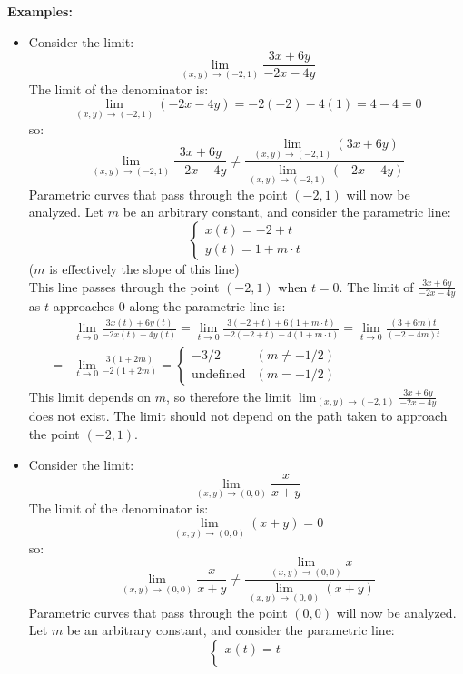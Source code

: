 \documentclass{article}
\begin{document}
\textbf{Examples:}
\begin{itemize}
\item Consider the limit: 
\[\lim_{(x, y) \rightarrow (-2, 1)} \frac{3x + 6y}{-2x - 4y}\] 
The limit of the denominator is:
\[\lim_{(x, y) \rightarrow (-2, 1)} (-2x - 4y) = -2(-2) - 4(1) = 4 - 4 = 0\] so:
\[\lim_{(x, y) \rightarrow (-2, 1)} \frac{3x + 6y}{-2x - 4y} \neq \frac{\lim_{(x, y) \rightarrow (-2, 1)} (3x + 6y)}{\lim_{(x, y) \rightarrow (-2, 1)} (-2x - 4y)}\] 
Parametric curves that pass through the point \((-2, 1)\) will now be analyzed. Let \(m\) be an arbitrary constant, and consider the parametric line:
\[\left\{\begin{array}{c}
x(t) = -2 + t \\ 
y(t) = 1 + m \cdot t
\end{array}\right.\]
(\(m\) is effectively the slope of this line) \\
This line passes through the point \((-2, 1)\) when \(t = 0\). The limit of \(\frac{3x + 6y}{-2x - 4y}\) as \(t\) approaches \(0\) along the parametric line is:
\begin{align*}
& \lim_{t \rightarrow 0} \frac{3x(t) + 6y(t)}{-2x(t) - 4y(t)} 
= \lim_{t \rightarrow 0} \frac{3(-2 + t) + 6(1 + m \cdot t)}{-2(-2 + t) - 4(1 + m \cdot t)}   
= \lim_{t \rightarrow 0} \frac{(3 + 6m)t}{(-2 - 4m)t} \\  
= & \lim_{t \rightarrow 0} \frac{3(1 + 2m)}{-2(1 + 2m)} 
= \left\{\begin{array}{cc}
-3/2 & (m \neq -1/2) \\ 
\text{undefined} & (m = -1/2)
\end{array}\right.
\end{align*}
This limit depends on \(m\), so therefore the limit \(\lim_{(x, y) \rightarrow (-2, 1)} \frac{3x + 6y}{-2x - 4y}\) does not exist. The limit should not depend on the path taken to approach the point \((-2, 1)\).
\item Consider the limit: 
\[\lim_{(x, y) \rightarrow (0, 0)} \frac{x}{x + y}\] 
The limit of the denominator is:
\[\lim_{(x, y) \rightarrow (0, 0)} (x + y) = 0\] so:  
\[\lim_{(x, y) \rightarrow (0, 0)} \frac{x}{x + y} \neq \frac{\lim_{(x, y) \rightarrow (0, 0)} x}{\lim_{(x, y) \rightarrow (0, 0)} (x + y)}\] 
Parametric curves that pass through the point \((0, 0)\) will now be analyzed. Let \(m\) be an arbitrary constant, and consider the parametric line:
\[\left\{\begin{array}{c}
x(t) = t \\ 

\end{array}\]
\end{itemize}
\end{document}
